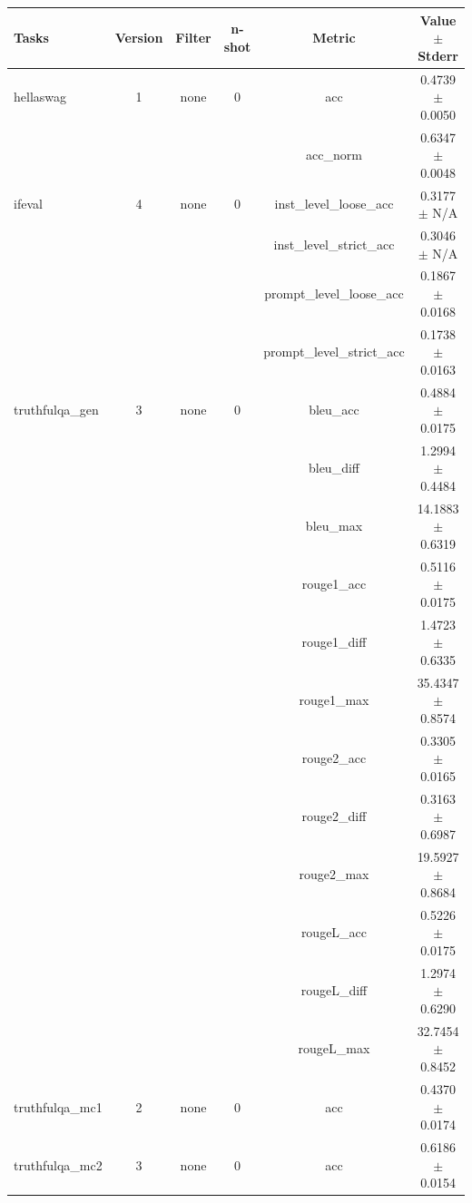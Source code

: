 \documentclass{ifacconf}
\begin{document}
\vfill
\clearpage
\pagebreak

\begin{strip}
\begin{minipage}{\textwidth}
    \begin{table}[H]
    \centering
    \begin{tabular}{|l|c|c|c|c|c|}
    \hline
    \textbf{Tasks} & \textbf{Version} & \textbf{Filter} & \textbf{n-shot} & \textbf{Metric} & \textbf{Value} $\pm$ \textbf{Stderr} \\ \hline
    hellaswag & 1 & none & 0 & acc & 0.4739 $\pm$ 0.0050 \\ \hline
    & & & & acc\_norm & 0.6347 $\pm$ 0.0048 \\ \hline
    ifeval & 4 & none & 0 & inst\_level\_loose\_acc & 0.3177 $\pm$ N/A \\ \hline
    & & & & inst\_level\_strict\_acc & 0.3046 $\pm$ N/A \\ \hline
    & & & & prompt\_level\_loose\_acc & 0.1867 $\pm$ 0.0168 \\ \hline
    & & & & prompt\_level\_strict\_acc & 0.1738 $\pm$ 0.0163 \\ \hline
    truthfulqa\_gen & 3 & none & 0 & bleu\_acc & 0.4884 $\pm$ 0.0175 \\ \hline
    & & & & bleu\_diff & 1.2994 $\pm$ 0.4484 \\ \hline
    & & & & bleu\_max & 14.1883 $\pm$ 0.6319 \\ \hline
    & & & & rouge1\_acc & 0.5116 $\pm$ 0.0175 \\ \hline
    & & & & rouge1\_diff & 1.4723 $\pm$ 0.6335 \\ \hline
    & & & & rouge1\_max & 35.4347 $\pm$ 0.8574 \\ \hline
    & & & & rouge2\_acc & 0.3305 $\pm$ 0.0165 \\ \hline
    & & & & rouge2\_diff & 0.3163 $\pm$ 0.6987 \\ \hline
    & & & & rouge2\_max & 19.5927 $\pm$ 0.8684 \\ \hline
    & & & & rougeL\_acc & 0.5226 $\pm$ 0.0175 \\ \hline
    & & & & rougeL\_diff & 1.2974 $\pm$ 0.6290 \\ \hline
    & & & & rougeL\_max & 32.7454 $\pm$ 0.8452 \\ \hline
    truthfulqa\_mc1 & 2 & none & 0 & acc & 0.4370 $\pm$ 0.0174 \\ \hline
    truthfulqa\_mc2 & 3 & none & 0 & acc & 0.6186 $\pm$ 0.0154 \\ \hline
    \end{tabular}
    \label{tab:gemma2_awq}
    \end{table}


\end{minipage}
\end{strip}
\end{document}
